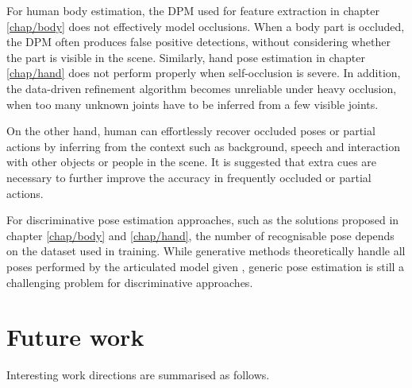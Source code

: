 For human body estimation, the DPM used for feature extraction in chapter \ref{chap/body} does not effectively model occlusions. When a body part is occluded, the DPM often produces false positive detections, without considering whether the part is visible in the scene. Similarly, hand pose estimation in chapter \ref{chap/hand} does not perform properly when self-occlusion is severe. In addition, the data-driven refinement algorithm becomes unreliable under heavy occlusion, when too many unknown joints have to be inferred from a few visible joints. 

On the other hand, human can effortlessly recover occluded poses or partial actions by inferring from the context such as background, speech and interaction with other objects or people in the scene. It is suggested that extra cues are necessary to further improve the accuracy in frequently occluded or partial actions. 

For discriminative pose estimation approaches, such as the solutions proposed in chapter \ref{chap/body} and \ref{chap/hand}, the number of recognisable pose depends on the dataset used in training. While generative methods theoretically handle all poses performed by the articulated model given \cite{Oikonomidis2011}, generic pose estimation is still a challenging problem for discriminative approaches. 

\section{Future work}

Interesting work directions are summarised as follows.

